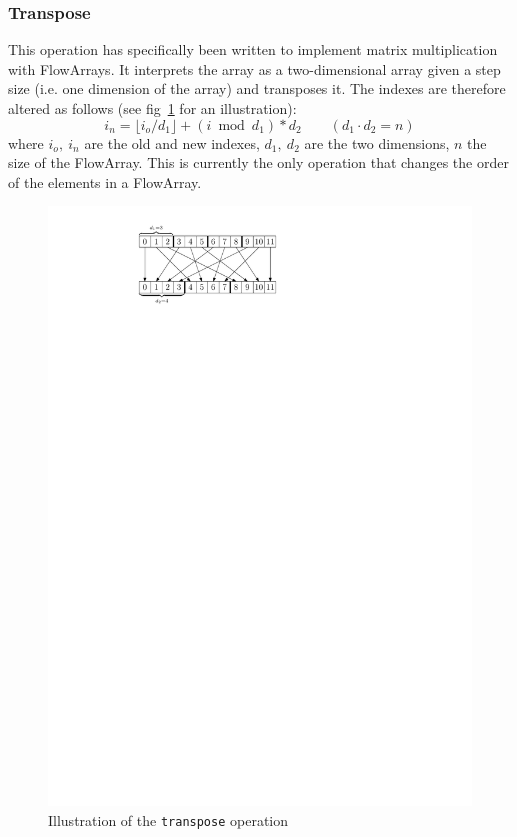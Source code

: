 \documentclass[runningheads,a4paper,fleqn]{llncs}
\begin{document}
\subsubsection{Transpose}
This operation has specifically been written to implement matrix
multiplication with FlowArrays. It interprets the array as a
two-dimensional array given a step size (i.e. one dimension of the
array) and transposes it. The indexes are therefore altered as
follows (see fig~\ref{fig:transpose} for an illustration):
\[ i_n = \lfloor i_o / d_1 \rfloor + (i \bmod d_1) * d_2 \qquad (d_1
\cdot d_2 = n)\]
where $i_o,\ i_n$ are the old and new indexes, $d_1,\ d_2$ are the two
dimensions, $n$ the size of the FlowArray. This is currently the only
operation that changes the order of the elements in a FlowArray.

\begin{figure}
\centering
\includegraphics{transpose}
\caption{Illustration of the \texttt{transpose} operation}
\label{fig:transpose}
\end{figure}
\end{document}

